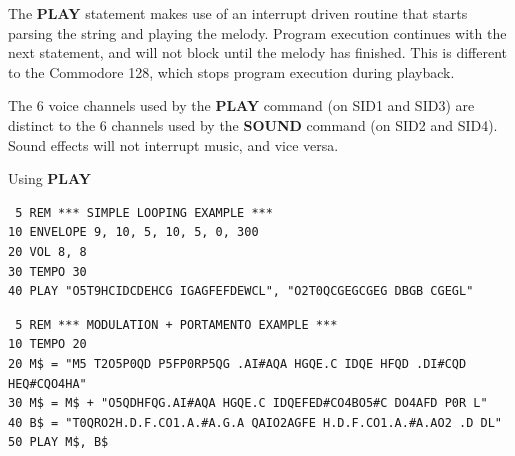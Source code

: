 \begin{description}[leftmargin=2cm,style=nextline]
\item [Remarks:]  The {\bf PLAY} statement makes use of an interrupt driven routine that starts parsing the string and playing the melody. Program execution continues with the next statement, and will not block until the melody has finished. This is different to the Commodore 128, which stops program execution during playback.

                  The 6 voice channels used by the {\bf PLAY} command (on SID1 and SID3) are distinct to the 6 channels used by the {\bf SOUND} command (on SID2 and SID4). Sound effects will not interrupt music, and vice versa.

\item [Examples:] Using {\bf PLAY}

\begin{tcolorbox}[colback=black,coltext=white]
\verbatimfont{\codefont}
\begin{verbatim}
 5 REM *** SIMPLE LOOPING EXAMPLE ***
10 ENVELOPE 9, 10, 5, 10, 5, 0, 300
20 VOL 8, 8
30 TEMPO 30
40 PLAY "O5T9HCIDCDEHCG IGAGFEFDEWCL", "O2T0QCGEGCGEG DBGB CGEGL"
\end{verbatim}
\end{tcolorbox}

\begin{tcolorbox}[colback=black,coltext=white]
\verbatimfont{\codefont}
\begin{verbatim}
 5 REM *** MODULATION + PORTAMENTO EXAMPLE ***
10 TEMPO 20
20 M$ = "M5 T2O5P0QD P5FP0RP5QG .AI#AQA HGQE.C IDQE HFQD .DI#CQD HEQ#CQO4HA"
30 M$ = M$ + "O5QDHFQG.AI#AQA HGQE.C IDQEFED#CO4BO5#C DO4AFD P0R L"
40 B$ = "T0QRO2H.D.F.CO1.A.#A.G.A QAIO2AGFE H.D.F.CO1.A.#A.AO2 .D DL"
50 PLAY M$, B$
\end{verbatim}
\end{tcolorbox}
\end{description}


\newpage
